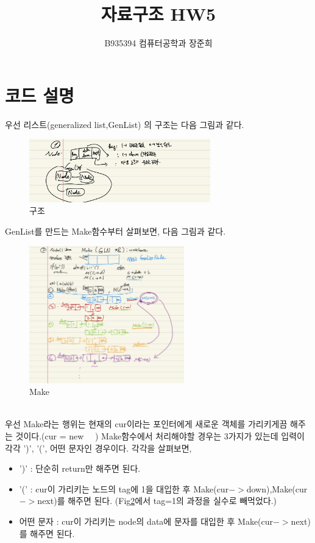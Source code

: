 \documentclass[a4paper,11pt]{article}
\begin{document}
\title{자료구조 HW5}
\author{B935394 컴퓨터공학과 장준희}
\maketitle
\newpage
\section{코드 설명}
우선 리스트(generalized list,GenList) 의 구조는 다음 그림과 같다.\\
\begin{figure}[h]
\begin{center}
\includegraphics[width=0.7\textwidth]{struct}
\caption{구조}
\label{fig:fig1}
\end{center}
\end{figure}
\newline
GenList를 만드는 Make함수부터 살펴보면, 다음 그림과 같다.
\begin{figure}[h]
\begin{center}
\includegraphics[width=0.6\textwidth]{make}
\caption{Make}
\label{fig:fig2}
\end{center}
\end{figure}
\\우선 Make라는 행위는 현재의 cur이라는 포인터에게 새로운 객체를 가리키게끔 해주는 것이다.(cur = new ~~)
Make함수에서 처리해야할 경우는 3가지가 있는데 입력이 각각 ')', '(', 어떤 문자인 경우이다. 각각을 살펴보면,
\begin{itemize}
\item ')' : 단순히 return만 해주면 된다.
\item '(' : cur이 가리키는 노드의 tag에 1을 대입한 후 Make(cur$->$down),Make(cur$->$next)를 해주면 된다. (Fig\ref{fig:fig2}에서 tag=1의 과정을 실수로 빼먹었다.)
\item 어떤 문자 : cur이 가리키는 node의 data에 문자를 대입한 후 Make(cur$->$next)를 해주면 된다.
\end{itemize}
\end{document}
